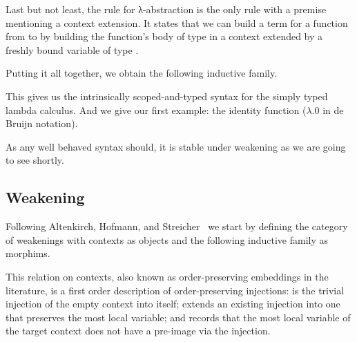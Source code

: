 Last but not least, the rule for λ-abstraction is the only rule
with a premise mentioning a context extension. It states that
we can build a term for a function from  to  by
building the function's body of type  in a context extended
by a freshly bound variable of type .

\noindent
\begin{minipage}[t]{.25\textwidth}
\end{minipage}\hfill
\begin{minipage}[t]{.17\textwidth}
\begin{mathpar}
\end{mathpar}
\end{minipage}

Putting it all together, we obtain the following inductive family.

\begin{AgdaAlign}
\begin{AgdaSuppressSpace}
\end{AgdaSuppressSpace}
\end{AgdaAlign}

This gives us the intrinsically scoped-and-typed syntax for
the simply typed lambda calculus.
And we give our first example: the identity function ($λ.0$ in de Bruijn notation).


As any well behaved syntax should,
it is stable under weakening as we are going to see shortly.

\subsection{Weakening}

Following Altenkirch, Hofmann, and Streicher~\cite{DBLP:conf/ctcs/AltenkirchHS95}
we start by defining the category of weakenings with contexts
as objects and the following inductive family as morphims.


This relation on contexts, also known as order-preserving embeddings in the
literature, is a first order description of order-preserving
injections:
 is the trivial injection of the empty context into
itself;
 extends an existing injection into one that preserves
the most local variable;
and  records that the most local variable of the target
context does not have a pre-image via the injection.

